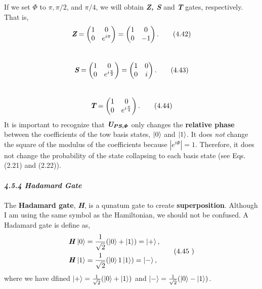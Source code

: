 \documentclass{article}
\newcommand{\bfit}[1]{\textbf{\textit{#1}}}
\begin{document}
If we set $\varPhi$ to $\pi, \pi/2$, and $\pi/4$, we will obtain \textit{\textbf{Z, S}} and \textit{\textbf{T}} gates, respectively.
That is,
\begin{equation} \label{eq 4.42}
\textit{\textbf{Z}}=\begin{pmatrix}
    1& 0\\0& e^{i\pi}
\end{pmatrix}= \begin{pmatrix}
    1& 0\\0& -1
\end{pmatrix}. \tag{4.42}
\end{equation}\\
\begin{equation} \label{eq 4.43}
    \textit{\textbf{S}}=\begin{pmatrix}
    1& 0\\0& e^{i\frac{\pi}{2}}
\end{pmatrix}= \begin{pmatrix}
    1& 0\\0& i
\end{pmatrix}. \tag{4.43}
\end{equation}\\
\begin{equation} \label{eq 4.44}
    \textit{\textbf{T}}=\begin{pmatrix}
    1& 0\\0& e^{i\frac{\pi}{4}}
\end{pmatrix}.\tag{4.44}
\end{equation}
It is important to recognize that $\textit{\textbf{U}}_{\boldsymbol{PS,\varPhi}}$ only
changes the \textbf{relative phase} between the coefficients of the tow basis
states, $\ket{0}$ and $\ket{1}$. It does \textit{not} change the square of the modulus
of the coefficients because $|e^{i\varPhi}|=1$. Therefore, it does not
change the probability of the state collapsing to each basis state (see Eqs. (2.21) and (2.22)).
\\\\
\bfit{\large 4.5.4 Hadamard Gate}\\\\
The \textbf{Hadamard gate}, \bfit{H}, is a qunatum gate to create
\textbf{superposition}. Although I am using the same symbol as the Hamiltonian,
we should not be confused. A Hadamard gate is define as, 
\begin{align} \label{eq 4.45}
    \begin{split}
        \bfit{H}\ket{0}&=\frac{1}{\sqrt{2}}(\ket{0}+\ket{1})=\ket{+},\\
        \bfit{H}\ket{1}&=\frac{1}{\sqrt{2}}(\ket{0}1\ket{1})=\ket{-},
    \end{split}\tag{4.45    }
\end{align}
where we have dfined $\ket{+}=\frac{1}{\sqrt{2}}(\ket{0}+\ket{1})$ and
$\ket{-}=\frac{1}{\sqrt{2}}(\ket{0}-\ket{1})$.
\end{document}
